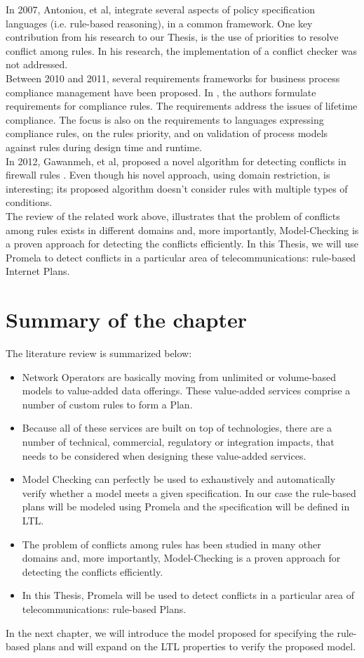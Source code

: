 In 2007, Antoniou, et al, integrate several aspects of policy specification languages (i.e. rule-based reasoning), in a common framework. One key contribution from his research to our Thesis, is the use of priorities to resolve conflict among rules. In his research, the implementation of a conflict checker was not addressed. \\

Between 2010 and 2011, several requirements frameworks for business process compliance management have been proposed. In \cite{Abramowicz2010,Hantry2011}, the authors formulate requirements for compliance rules. The requirements address the issues of lifetime compliance. The focus is also on the requirements to languages expressing compliance rules, on the rules priority, and on validation of process models against rules during design time and runtime. \\

In 2012, Gawanmeh, et al, proposed a novel algorithm for detecting conflicts in firewall rules \cite{Gawanmeh2012}. Even though his novel approach, using domain restriction, is interesting; its proposed algorithm doesn't consider rules with multiple types of conditions. \\

The review of the related work above, illustrates that the problem of conflicts among rules exists in different domains and, more importantly, Model-Checking is a proven approach for detecting the conflicts efficiently. In this Thesis, we will use Promela to detect conflicts in a particular area of telecommunications: rule-based Internet Plans. \\ 

\section{Summary of the chapter}
\noindent
The literature review is summarized below:
   \begin{itemize}
      \item Network Operators are basically moving from unlimited or volume-based models to value-added data offerings. These value-added services comprise a number of custom rules to form a Plan. 
      \item Because all of these services are built on top of technologies, there are a number of technical, commercial, regulatory or integration impacts, that needs to be considered when designing these value-added services. 
      \item Model Checking can perfectly be used to exhaustively and automatically verify whether a model meets a given specification. In our case the rule-based plans will be modeled using Promela and the specification will be defined in LTL. 
	  \item The problem of conflicts among rules has been studied in many other domains and, more importantly, Model-Checking is a proven approach for detecting the conflicts efficiently.
	  \item In this Thesis, Promela will be used to detect conflicts in a particular area of telecommunications: rule-based Plans.
    \end{itemize} \bigskip

In the next chapter, we will introduce the model proposed for specifying the rule-based plans and will expand on the LTL properties to verify the proposed model. \\

\clearpage